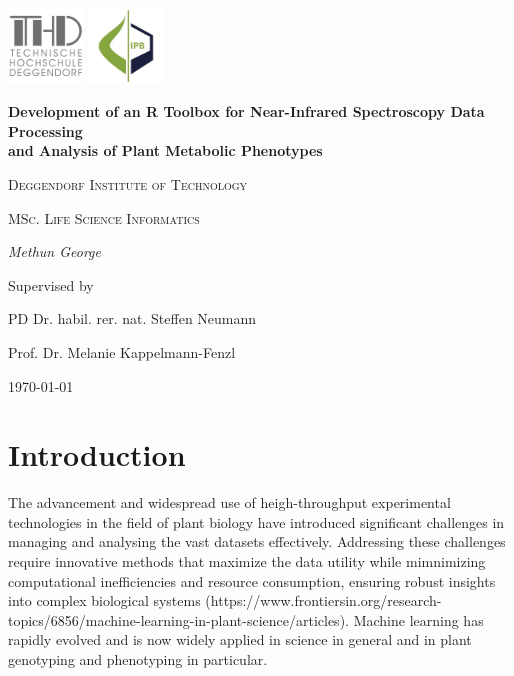 \documentclass[12pt,a4paper]{report}
\begin{document}
\begin{titlepage}
    \centering
    \begin{flushright}
        \centering
        \includegraphics[width=2cm]{images/thd.png} %
        \hspace{0cm} %
        \includegraphics[width=2cm]{images/ipb.jpg} %
    \end{flushright}
    {\huge\bfseries Development of an R Toolbox for Near-Infrared Spectroscopy Data Processing \\
    and Analysis of Plant Metabolic Phenotypes\par}
    \vspace{2cm}
    {\LARGE \textsc{Deggendorf Institute of Technology}\par}
    \vspace{1cm}
    {\Large \textsc{MSc. Life Science Informatics}\par}
    \vspace{1.5cm}
    {\Large\itshape Methun George\par}
    \vfill
    Supervised by\par
    PD Dr. habil. rer. nat. Steffen Neumann\par
    Prof. Dr. Melanie Kappelmann-Fenzl
    \vfill
    {\large \today\par}
\end{titlepage}

\newpage
\tableofcontents
\newpage


\chapter{Introduction}
The advancement and widespread use of heigh-throughput experimental 
technologies in the field of plant biology have introduced significant 
challenges in managing and analysing the vast datasets effectively. Addressing
these challenges require innovative methods that maximize the data utility 
while mimnimizing computational inefficiencies and resource consumption, ensuring
robust insights into complex biological systems (https://www.frontiersin.org/research-topics/6856/machine-learning-in-plant-science/articles).
Machine learning has rapidly evolved and is now widely applied in science in general and in plant genotyping and phenotyping in particular.
\end{document}
